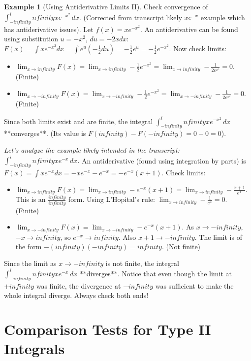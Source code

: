 \documentclass[11pt]{article}
\def\infty{infinity}%
\theoremstyle{definition}
\newtheorem{example}[theorem]{Example}
\newcommand{\dx}{\, dx} %
\begin{document}
\begin{example}[Using Antiderivative Limits II]
    Check convergence of $\int_{-\infty}^\infty x e^{-x^2} \dx$. (Corrected from transcript likely $xe^{-x}$ example which has antiderivative issues).
    Let $f(x) = xe^{-x^2}$. An antiderivative can be found using substitution $u=-x^2$, $du=-2x dx$:
    $F(x) = \int x e^{-x^2} dx = \int e^u (-\frac{1}{2} du) = -\frac{1}{2} e^u = -\frac{1}{2} e^{-x^2}$.
    Now check limits:
    \begin{itemize}
        \item $\lim_{x \to \infty} F(x) = \lim_{x \to \infty} -\frac{1}{2} e^{-x^2} = \lim_{x \to \infty} -\frac{1}{2e^{x^2}} = 0$. (Finite)
        \item $\lim_{x \to -\infty} F(x) = \lim_{x \to -\infty} -\frac{1}{2} e^{-x^2} = \lim_{x \to -\infty} -\frac{1}{2e^{x^2}} = 0$. (Finite)
    \end{itemize}
    Since both limits exist and are finite, the integral $\int_{-\infty}^\infty x e^{-x^2} \dx$ **converges**. (Its value is $F(\infty) - F(-\infty) = 0 - 0 = 0$).

    \textit{Let's analyze the example likely intended in the transcript: $\int_{-\infty}^\infty x e^{-x} \dx$.}
    An antiderivative (found using integration by parts) is $F(x) = \int x e^{-x} dx = -xe^{-x} - e^{-x} = -e^{-x}(x+1)$.
    Check limits:
    \begin{itemize}
        \item $\lim_{x \to \infty} F(x) = \lim_{x \to \infty} -e^{-x}(x+1) = \lim_{x \to \infty} -\frac{x+1}{e^x}$. This is an $\frac{\infty}{\infty}$ form. Using L'Hopital's rule: $\lim_{x \to \infty} -\frac{1}{e^x} = 0$. (Finite)
        \item $\lim_{x \to -\infty} F(x) = \lim_{x \to -\infty} -e^{-x}(x+1)$. As $x \to -\infty$, $-x \to \infty$, so $e^{-x} \to \infty$. Also $x+1 \to -\infty$. The limit is of the form $-(\infty)(-\infty) = \infty$. (Not finite)
    \end{itemize}
    Since the limit as $x \to -\infty$ is not finite, the integral $\int_{-\infty}^\infty x e^{-x} \dx$ **diverges**. Notice that even though the limit at $+\infty$ was finite, the divergence at $-\infty$ was sufficient to make the whole integral diverge. Always check both ends!
\end{example}

\section{Comparison Tests for Type II Integrals}
\end{document}
